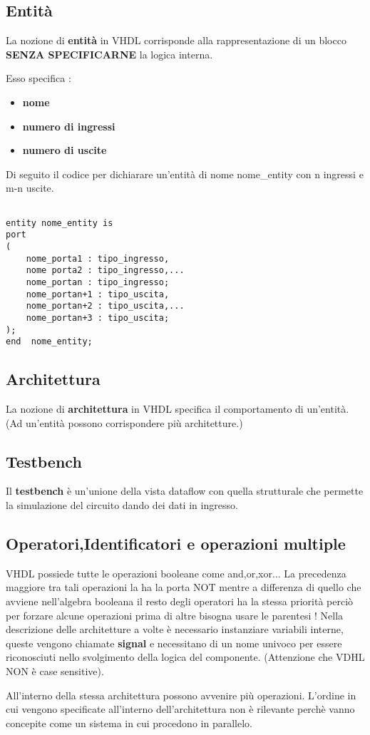 \documentclass{book}
\begin{document}
\newpage
\subsection*{Entità}

La nozione di \textbf{entità} in VHDL corrisponde alla rappresentazione di un blocco \textbf{SENZA SPECIFICARNE} la logica interna.

Esso specifica :

\begin{itemize}
\item \textbf{nome}
\item \textbf{numero di ingressi}
\item \textbf{numero di uscite}

\end{itemize}

Di seguito il codice per dichiarare un'entità di nome nome_entity con n ingressi e m-n uscite.

\begin{verbatim}

entity nome_entity is
port
(	
	nome_porta1 : tipo_ingresso,
	nome porta2 : tipo_ingresso,...
	nome_portan : tipo_ingresso;
	nome_portan+1 : tipo_uscita,
	nome_portan+2 : tipo_uscita,...
	nome_portan+3 : tipo_uscita;
);
end  nome_entity;

\end{verbatim}


\subsection*{Architettura}

La nozione di \textbf{architettura} in VHDL specifica il comportamento di un'entità.
(Ad un'entità possono corrispondere più architetture.)


\subsection*{Testbench}

Il \textbf{testbench} è un'unione della vista dataflow con quella strutturale che permette la simulazione del circuito dando dei dati in ingresso.

\subsection*{Operatori,Identificatori e operazioni multiple}

VHDL possiede tutte le operazioni booleane come and,or,xor...\break\nextline
La precedenza maggiore tra tali operazioni la ha la porta NOT mentre a differenza di quello che avviene nell'algebra booleana il resto degli operatori ha la stessa priorità perciò per forzare alcune operazioni prima di altre bisogna usare le parentesi !\nextline
Nella descrizione delle architetture a volte è necessario instanziare variabili interne, queste vengono chiamate \textbf{signal} e necessitano di un nome univoco per essere riconosciuti nello svolgimento della logica del componente.\break\nextline
(Attenzione che VDHL NON è case sensitive).

All'interno della stessa architettura possono avvenire più operazioni. L'ordine in cui vengono specificate all'interno dell'architettura non è rilevante perchè vanno concepite come un sistema in cui procedono in parallelo.
\end{document}
